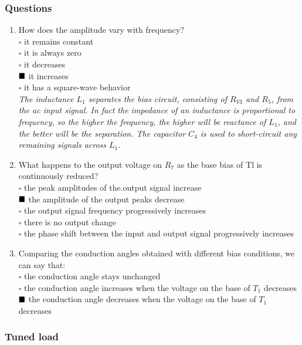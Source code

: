 \documentclass[12pt,a4paper]{article}
\begin{document}
    \subsubsection{Questions}
    \begin{enumerate}
        \item How does the amplitude vary with frequency?\\
            \(\square\) it remains constant \\
            \(\square\) it is always zero \\
            \(\square\) it decreases \\
            \(\textcolor{black}{\blacksquare}\) it increases \\
            \(\square\) it has a square-wave behavior\\
            \textit{The inductance $L_1$ separates the bias circuit, consisting of $R_{V3}$ and $R_5$, from the ac input signal. In fact the impedance of an inductance is proportional to frequency, so the higher the frequency, the higher will be reactance of $L_1$, and the better will be the separation. The capacitor $C_4$ is used to short-circuit any remaining signals across $L_1$.}
        \item What happens to the output voltage on $R_7$ as the base bias of Tl is continuously reduced?\\
            \(\square\) the peak amplitudes of the.output signal increase\\
            \(\textcolor{black}{\blacksquare}\) the amplitude of the output peaks decrease\\
            \(\square\) the output signal frequency progressively increases\\
            \(\square\) there is no output change\\
            \(\square\) the phase shift between the input and output signal progressively increases
        \item Comparing the conduction angles obtained with different bias conditions, we can say that:\\
            \(\square\) the conduction angle stays unchanged\\
            \(\square\) the conduction angle increases when the voltage on the base of $T_1$ decreases\\
            \(\textcolor{black}{\blacksquare}\) the conduction angle decreases when the voltage on the base of $T_1$ decreases
    \end{enumerate}
    \subsubsection{Tuned load}
\end{document}
